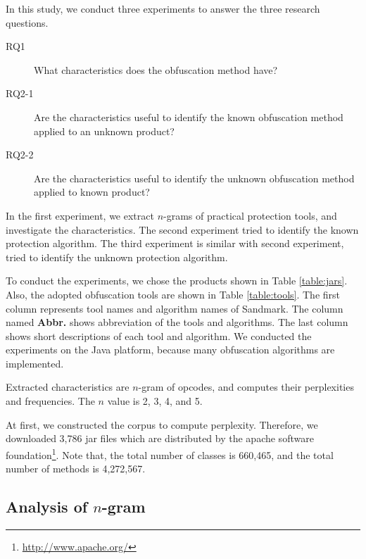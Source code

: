 \documentclass[conference]{IEEEtran}
\begin{document}
In this study, we conduct three experiments to answer the three
research questions.
\begin{description}
\item[RQ1]   What characteristics does the obfuscation method have?
\item[RQ2-1] Are the characteristics useful to identify the known
  obfuscation method applied to an unknown product?
\item[RQ2-2] Are the characteristics useful to identify the unknown
  obfuscation method applied to known product?
\end{description}
In the first experiment, we extract $n$-grams of practical protection
tools, and investigate the characteristics.
%
The second experiment tried to identify the known protection
algorithm.  The third experiment is similar with second experiment,
tried to identify the unknown protection algorithm.

To conduct the experiments, we chose the products shown in Table
\ref{table:jars}.  Also, the adopted obfuscation tools are shown in
Table \ref{table:tools}.  The first column represents tool names and
algorithm names of Sandmark.  The column named \textbf{Abbr.} shows
abbreviation of the tools and algorithms.  The last column shows short
descriptions of each tool and algorithm.
%
We conducted the experiments on the Java platform, because many
obfuscation algorithms are implemented.

Extracted characteristics are $n$-gram of opcodes, and computes their
perplexities and frequencies.  The $n$ value is 2, 3, 4, and 5.


At first, we constructed the corpus to compute perplexity.
Therefore, we downloaded 3,786 jar files which are distributed by the
apache software foundation\footnote[4]{\url{http://www.apache.org/}}.
Note that, the total number of classes is 660,465, and the total
number of methods is 4,272,567.

\subsection{Analysis of $n$-gram}\label{sect:rq1}
\end{document}
